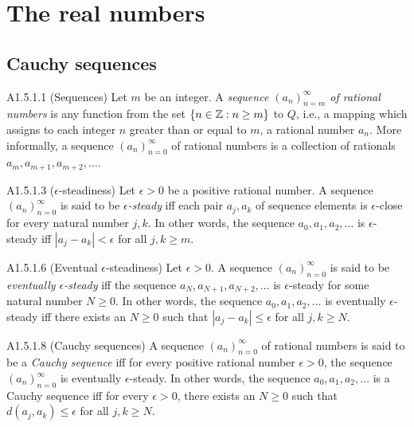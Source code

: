 \section{The real numbers}
\subsection{Cauchy sequences}
\begin{definition}{A1.5.1.1}
    (Sequences) Let $m$ be an integer. A \emph{sequence $(a_n)_{n=m}^{\infty}$ of
    rational numbers} is any function from the set $\{n \in \mathbb{Z}: n \geq m\}$ to
    $Q$, i.e., a mapping which assigns to each integer $n$ greater than or equal
    to $m$, a rational number $a_n$. More informally, a sequence $(a_n)_{n=0}^{\infty}$
    of rational numbers is a collection of rationals $a_m, a_{m+1}, a_{m+2}, \ldots$.
\end{definition}

\begin{definition}{A1.5.1.3}
    ($\epsilon$-steadiness) Let $\epsilon > 0$ be a positive rational number. A sequence
    $(a_n)_{n=0}^{\infty}$ is said to be \emph{$\epsilon$-steady} iff each pair $a_j, a_k$
    of sequence elements is $\epsilon$-close for every natural number $j, k$. In other
    words, the sequence $a_0, a_1, a_2, \ldots$ is $\epsilon$-steady iff $|a_j - a_k| < \epsilon$
    for all $j, k \geq m$.
\end{definition}

\begin{definition}{A1.5.1.6}
    (Eventual $\epsilon$-steadiness) Let $\epsilon > 0$. A sequence $(a_n)_{n=0}^{\infty}$ is
    said to be \emph{eventually $\epsilon$-steady} iff the sequence $a_N, a_{N+1}, a_{N+2}, \ldots$
    is $\epsilon$-steady for some natural number $N \geq 0$. In other words, the sequence
    $a_0, a_1, a_2, \ldots$ is eventually $\epsilon$-steady iff there exists an $N \geq 0$
    such that $|a_j - a_k| \leq \epsilon$ for all $j, k \geq N$.
\end{definition}

\begin{definition}{A1.5.1.8}
    (Cauchy sequences) A sequence $(a_n)_{n=0}^{\infty}$ of rational numbers is said
    to be a \emph{Cauchy sequence} iff for every positive rational number $\epsilon > 0$,
    the sequence $(a_n)_{n=0}^{\infty}$ is eventually $\epsilon$-steady. In other words,
    the sequence $a_0, a_1, a_2, \ldots$ is a Cauchy sequence iff for every $\epsilon > 0$,
    there exists an $N \geq 0$ such that $d(a_j, a_k) \leq \epsilon$ for all $j, k \geq N$.
\end{definition}

